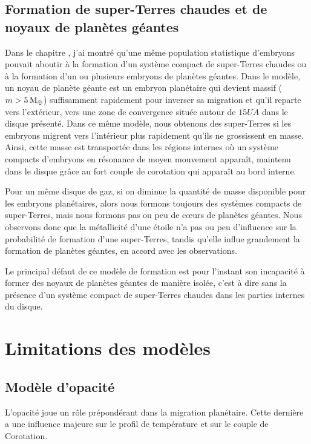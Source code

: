 \subsection{Formation de super-Terres chaudes et de noyaux de planètes géantes}
Dans le chapitre , j'ai montré qu'une même population statistique d'embryons pouvait aboutir à la formation d'un système compact de super-Terres chaudes ou à la formation d'un ou plusieurs embryons de planètes géantes. Dans le modèle, un noyau de planète géante est un embryon planétaire qui devient massif ($m>5\mathrm{\thinspace M_\oplus}$) suffisamment rapidement pour inverser sa migration et qu'il reparte vers l'extérieur, vers une zone de convergence située autour de $15\unit{UA}$ dans le disque présenté. Dans ce même modèle, nous obtenons des super-Terres si les embryons migrent vers l'intérieur plus rapidement qu'ils ne grossissent en masse. Ainsi, cette masse est transportée dans les régions internes où un système compacts d'embryons en résonance de moyen mouvement apparaît, maintenu dans le disque grâce au fort couple de corotation qui apparaît au bord interne.

Pour un même disque de gaz, si on diminue la quantité de masse disponible pour les embryons planétaires, alors nous formons toujours des systèmes compacts de super-Terres, mais nous formons pas ou peu de cœurs de planètes géantes. Nous observons donc que la métallicité d'une étoile n'a pas ou peu d'influence sur la probabilité de formation d'une super-Terres, tandis qu'elle influe grandement la formation de planètes géantes, en accord avec les observations. 

Le principal défaut de ce modèle de formation est pour l'instant son incapacité à former des noyaux de planètes géantes de manière isolée, c'est à dire sans la présence d'un système compact de super-Terres chaudes dans les parties internes du disque. 

\section{Limitations des modèles}
\subsection{Modèle d'opacité}
L'opacité joue un rôle prépondérant dans la migration planétaire. Cette dernière a une influence majeure sur le profil de température et sur le couple de Corotation. 

